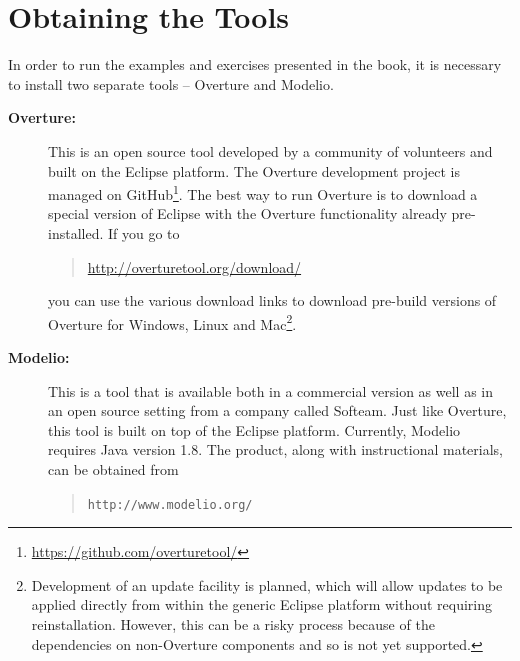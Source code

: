 \section{Obtaining the Tools}\label{sec:install}
In order to run the examples and exercises presented in the book, it is necessary to install two separate tools -- Overture and Modelio.
\begin{description}
\item[\textbf{Overture:}] This is an open source tool developed by a community of volunteers and built on the Eclipse platform. The Overture development project is managed on GitHub\footnote{\url{https://github.com/overturetool/}}.
The best way to run Overture is to download a special version of Eclipse with the Overture functionality already pre-installed. If you go to
  \begin{quote}
  \url{http://overturetool.org/download/}
  \end{quote}
  \noindent you can use the various download links to download pre-build versions of Overture for Windows, Linux and Mac\footnote{Development of an update facility is planned, which will allow updates to be applied directly from within the generic Eclipse platform without requiring reinstallation. However, this can be a risky process because of the dependencies on non-Overture components and so is not yet supported.}.

\item[\textbf{Modelio:}] This is a tool that is available both in a commercial version as well as in an open source setting from a company called Softeam. Just like Overture, this tool is built on top of the Eclipse platform. Currently, Modelio requires Java version 1.8.  The product, along with instructional materials, can be obtained from
\begin{quote}
\texttt{http://www.modelio.org/}
\end{quote}


\end{description}
